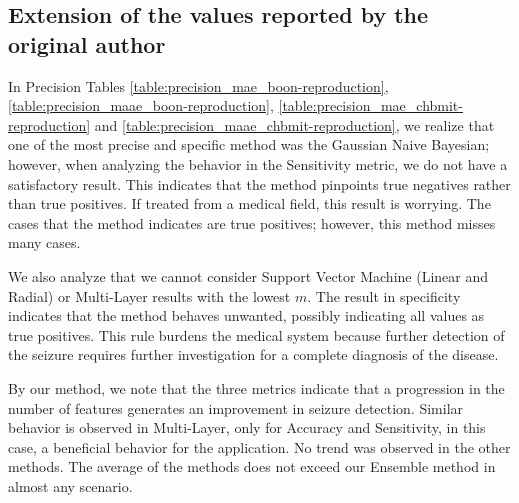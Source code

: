 \subsection{Extension of the values reported by the original author}
 
In Precision Tables \ref{table:precision_mae_boon-reproduction}, \ref{table:precision_maae_boon-reproduction}, \ref{table:precision_mae_chbmit-reproduction} and \ref{table:precision_maae_chbmit-reproduction}, we realize that one of the most precise and specific method was the Gaussian Naive Bayesian; however, when analyzing the behavior in the Sensitivity metric, we do not have a satisfactory result. This indicates that the method pinpoints true negatives rather than true positives. If treated from a medical field, this result is worrying. The cases that the method indicates are true positives; however, this method misses many cases.

We also analyze that we cannot consider Support Vector Machine (Linear and Radial) or Multi-Layer results with the lowest $m$. The result in specificity indicates that the method behaves unwanted, possibly indicating all values as true positives. This rule burdens the medical system because further detection of the seizure requires further investigation for a complete diagnosis of the disease.

By our method, we note that the three metrics indicate that a progression in the number of features generates an improvement in seizure detection. Similar behavior is observed in Multi-Layer, only for Accuracy and Sensitivity, in this case, a beneficial behavior for the application. No trend was observed in the other methods. The average of the methods does not exceed our Ensemble method in almost any scenario. 


